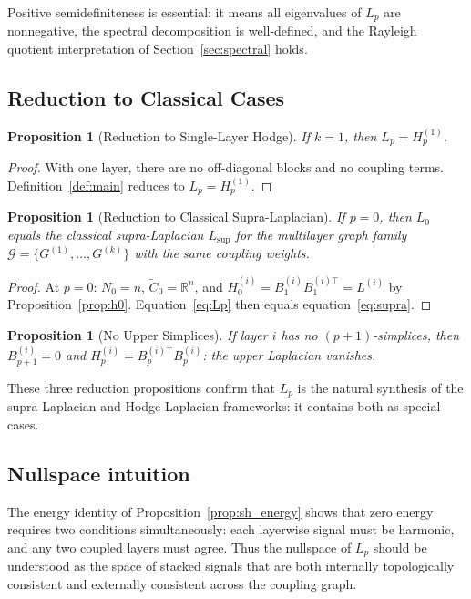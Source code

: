 \documentclass[11pt]{article}
\newtheorem{proposition}[theorem]{Proposition}
\theoremstyle{definition}
\theoremstyle{remark}
\newcommand{\R}{\mathbb{R}}
\newcommand{\Lsup}{L_{\mathrm{sup}}}
\newcommand{\Ctil}{\widetilde{C}}
\newcommand{\calG}{\mathcal{G}}
\begin{document}
Positive semidefiniteness is essential: it means all eigenvalues of $L_p$ are
nonnegative, the spectral decomposition is well-defined, and the Rayleigh
quotient interpretation of Section~\ref{sec:spectral} holds.

\subsection{Reduction to Classical Cases}

\begin{proposition}[Reduction to Single-Layer Hodge]
\label{prop:k1}
If $k=1$, then $L_p = H_p^{(1)}$.
\end{proposition}

\begin{proof}
With one layer, there are no off-diagonal blocks and no coupling terms.
Definition~\ref{def:main} reduces to $L_p = H_p^{(1)}$.
\end{proof}

\begin{proposition}[Reduction to Classical Supra-Laplacian]
\label{prop:p0}
If $p=0$, then $L_0$ equals the classical supra-Laplacian $\Lsup$ for the
multilayer graph family $\calG = \{G^{(1)},\dots,G^{(k)}\}$ with the same
coupling weights.
\end{proposition}

\begin{proof}
At $p=0$: $N_0 = n$, $\Ctil_0 = \R^n$, and $H_0^{(i)} = B_1^{(i)}B_1^{(i)\top}
= L^{(i)}$ by Proposition~\ref{prop:h0}. Equation~\eqref{eq:Lp} then equals
equation~\eqref{eq:supra}.
\end{proof}

\begin{proposition}[No Upper Simplices]
If layer $i$ has no $(p+1)$-simplices, then $B_{p+1}^{(i)}=0$ and
$H_p^{(i)} = B_p^{(i)\top}B_p^{(i)}$: the upper Laplacian vanishes.
\end{proposition}

These three reduction propositions confirm that $L_p$ is the natural synthesis
of the supra-Laplacian and Hodge Laplacian frameworks: it contains both as
special cases.

\subsection{Nullspace intuition}

The energy identity of Proposition~\ref{prop:sh_energy} shows that zero energy
requires two conditions simultaneously: each layerwise signal must be harmonic,
and any two coupled layers must agree. Thus the nullspace of $L_p$ should be
understood as the space of stacked signals that are both internally
topologically consistent and externally consistent across the coupling graph.
\end{document}
